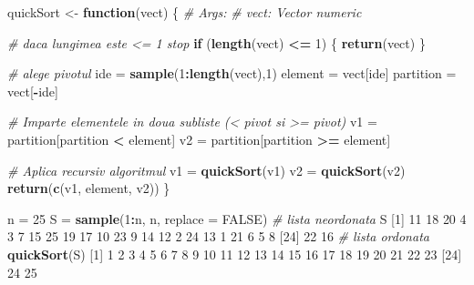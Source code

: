 \documentclass[]{article}
\newenvironment{Shaded}{\begin{snugshade}}{\end{snugshade}}
\newcommand{\KeywordTok}[1]{\textcolor[rgb]{0.13,0.29,0.53}{\textbf{#1}}}
\newcommand{\DataTypeTok}[1]{\textcolor[rgb]{0.13,0.29,0.53}{#1}}
\newcommand{\DecValTok}[1]{\textcolor[rgb]{0.00,0.00,0.81}{#1}}
\newcommand{\StringTok}[1]{\textcolor[rgb]{0.31,0.60,0.02}{#1}}
\newcommand{\CommentTok}[1]{\textcolor[rgb]{0.56,0.35,0.01}{\textit{#1}}}
\newcommand{\OtherTok}[1]{\textcolor[rgb]{0.56,0.35,0.01}{#1}}
\newcommand{\ControlFlowTok}[1]{\textcolor[rgb]{0.13,0.29,0.53}{\textbf{#1}}}
\newcommand{\OperatorTok}[1]{\textcolor[rgb]{0.81,0.36,0.00}{\textbf{#1}}}
\newcommand{\NormalTok}[1]{#1}
\begin{document}
\begin{Shaded}
\begin{Highlighting}[]
\NormalTok{quickSort <-}\StringTok{ }\ControlFlowTok{function}\NormalTok{(vect) \{}
  \CommentTok{# Args:}
  \CommentTok{#  vect: Vector numeric}
  
  \CommentTok{# daca lungimea este <= 1 stop}
  \ControlFlowTok{if}\NormalTok{ (}\KeywordTok{length}\NormalTok{(vect) }\OperatorTok{<=}\StringTok{ }\DecValTok{1}\NormalTok{) \{}
    \KeywordTok{return}\NormalTok{(vect)}
\NormalTok{  \}}
  
  \CommentTok{# alege pivotul}
\NormalTok{  ide =}\StringTok{ }\KeywordTok{sample}\NormalTok{(}\DecValTok{1}\OperatorTok{:}\KeywordTok{length}\NormalTok{(vect),}\DecValTok{1}\NormalTok{)}
\NormalTok{  element =}\StringTok{ }\NormalTok{vect[ide]}
\NormalTok{  partition =}\StringTok{ }\NormalTok{vect[}\OperatorTok{-}\NormalTok{ide]}
  
  \CommentTok{# Imparte elementele in doua subliste (< pivot si >= pivot)}
\NormalTok{  v1 =}\StringTok{ }\NormalTok{partition[partition }\OperatorTok{<}\StringTok{ }\NormalTok{element]}
\NormalTok{  v2 =}\StringTok{ }\NormalTok{partition[partition }\OperatorTok{>=}\StringTok{ }\NormalTok{element]}
  
  \CommentTok{# Aplica recursiv algoritmul}
\NormalTok{  v1 =}\StringTok{ }\KeywordTok{quickSort}\NormalTok{(v1)}
\NormalTok{  v2 =}\StringTok{ }\KeywordTok{quickSort}\NormalTok{(v2)}
  \KeywordTok{return}\NormalTok{(}\KeywordTok{c}\NormalTok{(v1, element, v2))}
\NormalTok{\}}

\NormalTok{n =}\StringTok{ }\DecValTok{25}
\NormalTok{S =}\StringTok{ }\KeywordTok{sample}\NormalTok{(}\DecValTok{1}\OperatorTok{:}\NormalTok{n, n, }\DataTypeTok{replace =} \OtherTok{FALSE}\NormalTok{)}
\CommentTok{# lista neordonata}
\NormalTok{S}
\NormalTok{ [}\DecValTok{1}\NormalTok{] }\DecValTok{11} \DecValTok{18} \DecValTok{20}  \DecValTok{4}  \DecValTok{3}  \DecValTok{7} \DecValTok{15} \DecValTok{25} \DecValTok{19} \DecValTok{17} \DecValTok{10} \DecValTok{23}  \DecValTok{9} \DecValTok{14} \DecValTok{12}  \DecValTok{2} \DecValTok{24} \DecValTok{13}  \DecValTok{1} \DecValTok{21}  \DecValTok{6}  \DecValTok{5}  \DecValTok{8}
\NormalTok{[}\DecValTok{24}\NormalTok{] }\DecValTok{22} \DecValTok{16}
\CommentTok{# lista ordonata}
\KeywordTok{quickSort}\NormalTok{(S)}
\NormalTok{ [}\DecValTok{1}\NormalTok{]  }\DecValTok{1}  \DecValTok{2}  \DecValTok{3}  \DecValTok{4}  \DecValTok{5}  \DecValTok{6}  \DecValTok{7}  \DecValTok{8}  \DecValTok{9} \DecValTok{10} \DecValTok{11} \DecValTok{12} \DecValTok{13} \DecValTok{14} \DecValTok{15} \DecValTok{16} \DecValTok{17} \DecValTok{18} \DecValTok{19} \DecValTok{20} \DecValTok{21} \DecValTok{22} \DecValTok{23}
\NormalTok{[}\DecValTok{24}\NormalTok{] }\DecValTok{24} \DecValTok{25}
\end{Highlighting}
\end{Shaded}
\end{document}
